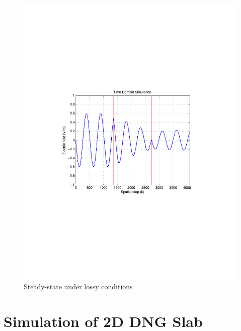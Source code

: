\documentclass{article}
\begin{document}
\begin{figure}[t!]
\centering
\includegraphics[scale=0.55, trim=3.5cm 8.7cm 4.5cm 8.75cm, clip]{Figures/FigCh03_1DDNGSteadyStateLossy.pdf}
\caption{Steady-state under lossy conditions}
\label{1DDNG-SteadyState-Lossy}
\end{figure}
\section{Simulation of 2D DNG Slab}
\end{document}
